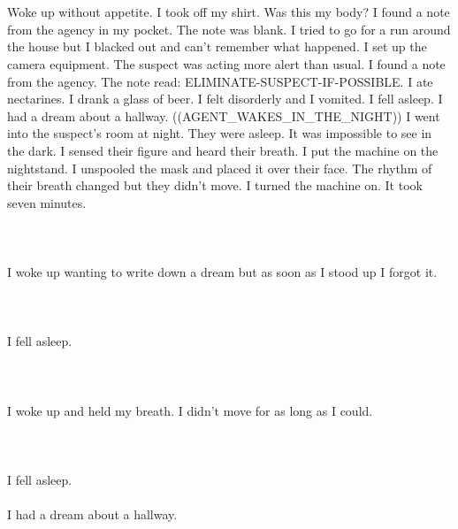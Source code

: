 \documentclass{article}
\begin{document}
    \section{}
    Woke up without appetite. I took off my shirt. Was this my body? I found a note from the agency in my pocket. The note was blank. I tried to go for a run around the house but I blacked out and can't remember what happened. I set up the camera equipment. The suspect was acting more alert than usual. I found a note from the agency. The note read: ELIMINATE-SUSPECT-IF-POSSIBLE. I ate nectarines. I drank a glass of beer. I felt disorderly and I vomited. I fell asleep. I had a dream about a hallway. ((AGENT_WAKES_IN_THE_NIGHT)) I went into the suspect's room at night. They were asleep. It was impossible to see in the dark. I sensed their figure and heard their breath. I put the machine on the nightstand. I unspooled the mask and placed it over their face. The rhythm of their breath changed but they didn't move. I turned the machine on. It took seven minutes. \\\\
    \newpage
    
    \section{}
    I woke up wanting to write down a dream but as soon as I stood up I forgot it.\\\\ 
    \newpage
    
    \section{}
    I fell asleep.\\\\ 
    \newpage
    
    \section{}
    I woke up and held my breath. I didn't move for as long as I could.\\\\ 
    \newpage
    
    \section{}
    I fell asleep.\\\\I had a dream about a hallway.\\\\ 
    \newpage
    
    
\end{document}
